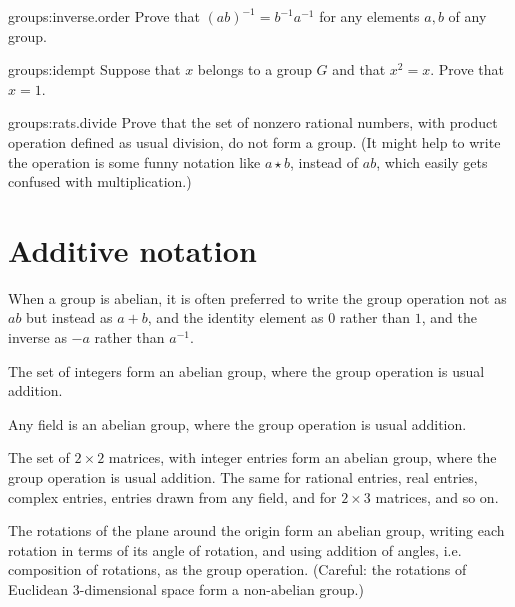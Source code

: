 \begin{problem}{groups:inverse.order}
Prove that \((ab)^{-1}=b^{-1}a^{-1}\) for any elements \(a,b\) of any group.
\end{problem}

\begin{problem}{groups:idempt}
Suppose that \(x\) belongs to a group \(G\) and that \(x^2=x\).
Prove that \(x=1\).
\end{problem}

\begin{problem}{groups:rats.divide}
Prove that the set of nonzero rational numbers, with product operation defined as usual division, do not form a group.
(It might help to write the operation is some funny notation like \(a \star b\), instead of \(ab\), which easily gets confused with multiplication.)
\end{problem}



\section{Additive notation}

When a group is abelian, it is often preferred to write the group operation not as \(ab\) but instead as \(a+b\), and the identity element as \(0\) rather than \(1\), and the inverse as \(-a\) rather than \(a^{-1}\).

\begin{example}
The set of integers form an abelian group, where the group operation is usual addition.
\end{example}
\begin{example}
Any field is an abelian  group, where the group operation is usual addition.
\end{example}
\begin{example}
The set of \(2 \times 2\) matrices, with integer entries form an abelian  group, where the group operation is usual addition.
The same for rational entries, real entries, complex entries, entries drawn from any field, and for \(2 \times 3\) matrices, and so on.
\end{example}
\begin{example}
The rotations of the plane around the origin form an abelian group, writing each rotation in terms of its angle of rotation, and using addition of angles, i.e. composition of rotations, as the group operation.
(Careful: the rotations of Euclidean 3-dimensional space form a non-abelian group.)
\end{example}


